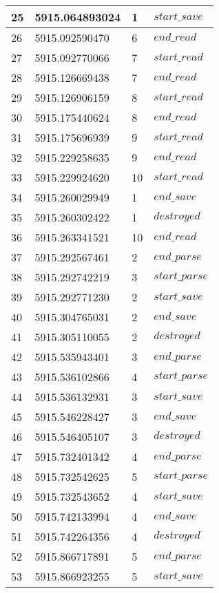 \begin{longtable}{|p{}|p{}|p{}|p{}|}
	\hline
	25 & 5915.064893024 & 1 & $start\_save$\\
	\hline
	26 & 5915.092590470 & 6 & $end\_read$\\
	\hline
	27 & 5915.092770066 & 7 & $start\_read$\\
	\hline
	28 & 5915.126669438 & 7 & $end\_read$\\
	\hline
	29 & 5915.126906159 & 8 & $start\_read$\\
	\hline
	30 & 5915.175440624 & 8 & $end\_read$\\
	\hline
	31 & 5915.175696939 & 9 & $start\_read$\\
	\hline
	32 & 5915.229258635 & 9 & $end\_read$\\
	\hline
	33 & 5915.229924620 & 10 & $start\_read$\\
	\hline
	34 & 5915.260029949 & 1 & $end\_save$\\
	\hline
	35 & 5915.260302422 & 1 & $destroyed$\\
	\hline
	36 & 5915.263341521 & 10 & $end\_read$\\
	\hline
	37 & 5915.292567461 & 2 & $end\_parse$\\
	\hline
	38 & 5915.292742219 & 3 & $start\_parse$\\
	\hline
	39 & 5915.292771230 & 2 & $start\_save$\\
	\hline
	40 & 5915.304765031 & 2 & $end\_save$\\
	\hline
	41 & 5915.305110055 & 2 & $destroyed$\\
	\hline
	42 & 5915.535943401 & 3 & $end\_parse$\\
	\hline
	43 & 5915.536102866 & 4 & $start\_parse$\\
	\hline
	44 & 5915.536132931 & 3 & $start\_save$\\
	\hline
	45 & 5915.546228427 & 3 & $end\_save$\\
	\hline
	46 & 5915.546405107 & 3 & $destroyed$\\
	\hline
	47 & 5915.732401342 & 4 & $end\_parse$\\
	\hline
	48 & 5915.732542625 & 5 & $start\_parse$\\
	\hline
	49 & 5915.732543652 & 4 & $start\_save$\\
	\hline
	50 & 5915.742133994 & 4 & $end\_save$\\
	\hline
	51 & 5915.742264356 & 4 & $destroyed$\\
	\hline
	52 & 5915.866717891 & 5 & $end\_parse$\\
	\hline
	53 & 5915.866923255 & 5 & $start\_save$\\

\end{longtable}
